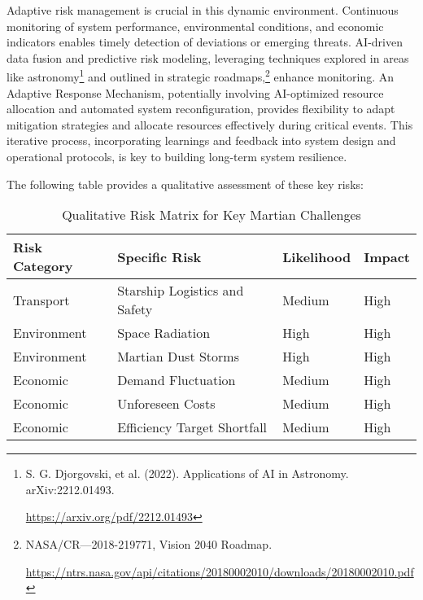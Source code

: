 \documentclass[fontsize=10pt, oneside, DIV=calc]{scrartcl}
\begin{document}
\medskip

\noindent
Adaptive risk management is crucial in this dynamic environment. Continuous monitoring of system performance, environmental conditions, and economic indicators enables timely detection of deviations or emerging threats. AI-driven data fusion and predictive risk modeling, leveraging techniques explored in areas like astronomy\footnote{S. G. Djorgovski, et al. (2022). Applications of AI in Astronomy. arXiv:2212.01493. 







\href{https://arxiv.org/pdf/2212.01493}\url{https://arxiv.org/pdf/2212.01493}} and outlined in strategic roadmaps,\footnote{NASA/CR—2018-219771, Vision 2040 Roadmap. 







\href{https://ntrs.nasa.gov/api/citations/20180002010/downloads/20180002010.pdf}\url{https://ntrs.nasa.gov/api/citations/20180002010/downloads/20180002010.pdf}} enhance monitoring. An Adaptive Response Mechanism, potentially involving AI-optimized resource allocation and automated system reconfiguration, provides flexibility to adapt mitigation strategies and allocate resources effectively during critical events. This iterative process, incorporating learnings and feedback into system design and operational protocols, is key to building long-term system resilience.

\medskip

\noindent
The following table provides a qualitative assessment of these key risks:

\begin{table}[htbp]
\centering
\caption{Qualitative Risk Matrix for Key Martian Challenges}
\begin{tabularx}{\textwidth}{|X|X|X|X|}
\hline
\textbf{Risk Category} & \textbf{Specific Risk} & \textbf{Likelihood} & \textbf{Impact} \\ \hline
Transport & Starship Logistics and Safety & Medium & High \\ \hline
Environment & Space Radiation & High & High \\ \hline
Environment & Martian Dust Storms & High & High \\ \hline
Economic & Demand Fluctuation & Medium & High \\ \hline
Economic & Unforeseen Costs & Medium & High \\ \hline
Economic & Efficiency Target Shortfall & Medium & High \\ \hline
\end{tabularx}
\end{table}
\end{document}
